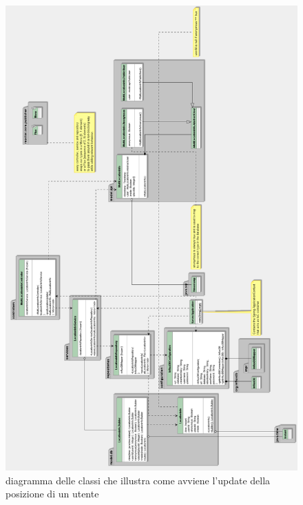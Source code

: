 \documentclass[../manuale-manutentore.tex]{subfiles}
\begin{document}
  \begin{figure}[H]
    \centering
    \includegraphics[width=\textwidth,height=\textheight]{img/server-influxDB-write-endpoint.png}
    \caption{diagramma delle classi che illustra come avviene l'update della posizione di un utente}%
     \label{fig:diagramma delle classi che illustra come avviene l'update della posizione di un}
  \end{figure}
\end{document}
